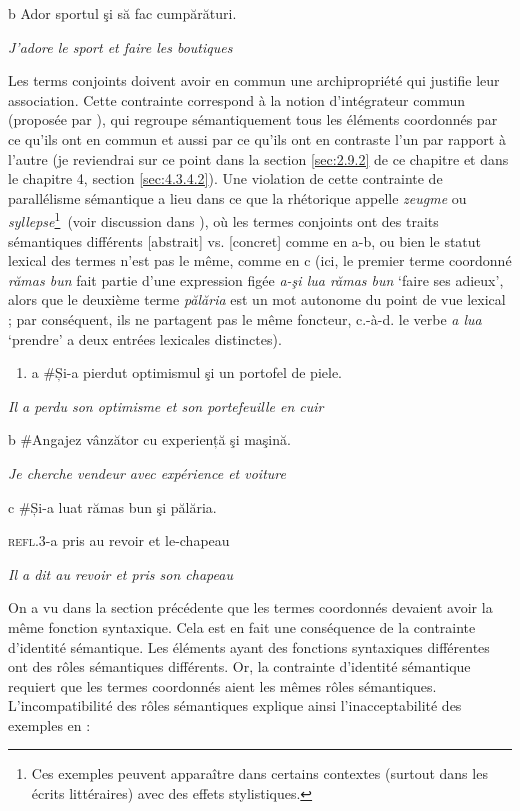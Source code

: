 b  Ador sportul şi să fac cumpărături. 

    \textit{J'adore le sport et faire les boutiques}

Les terms conjoints doivent avoir en commun une archipropriété qui justifie leur association. Cette contrainte correspond à la notion d'intégrateur commun (proposée par \citet{Lang1984}), qui regroupe sémantiquement tous les éléments coordonnés par ce qu'ils ont en commun et aussi par ce qu'ils ont en contraste l'un par rapport à l'autre (je reviendrai sur ce point dans la section \ref{sec:2.9.2} de ce chapitre et dans le chapitre 4, section \ref{sec:4.3.4.2}). Une violation de cette contrainte de parallélisme sémantique a lieu dans ce que la rhétorique appelle \textit{zeugme} ou \textit{syllepse}\footnote{Ces exemples peuvent apparaître dans certains contextes (surtout dans les écrits littéraires) avec des effets stylistiques.}~(voir discussion dans \citet{Zafiu2001}), où les termes conjoints ont des traits sémantiques différents [abstrait] vs. [concret] comme en a-b, ou bien le statut lexical des termes n'est pas le même, comme en c (ici, le premier terme coordonné \textit{rămas bun} fait partie d'une expression figée \textit{a-şi lua rămas bun} `faire ses adieux', alors que le deuxième terme \textit{pălăria} est un mot autonome du point de vue lexical ; par conséquent, ils ne partagent pas le même foncteur, c.-à-d. le verbe \textit{a lua} `prendre' a deux entrées lexicales distinctes). 


\begin{enumerate}
\item \label{bkm:Ref272834660}a  \#Și-a pierdut optimismul şi un portofel de piele.


\end{enumerate}
{\itshape
Il a perdu son optimisme et son portefeuille en cuir}

b  \#Angajez vânzător cu experiență şi maşină. 

{\itshape
Je cherche vendeur avec expérience et voiture}

c  \#Și-a  luat  rămas bun  şi  pălăria. 

    \textsc{refl.3}-a  pris  au revoir  et  le-chapeau

{\itshape
    Il a dit au revoir et pris son chapeau}

On a vu dans la section précédente que les termes coordonnés devaient avoir la même fonction syntaxique. Cela est en fait une conséquence de la contrainte d'identité sémantique. Les éléments ayant des fonctions syntaxiques différentes ont des rôles sémantiques différents. Or, la contrainte d'identité sémantique requiert que les termes coordonnés aient les mêmes rôles sémantiques. L'incompatibilité des rôles sémantiques explique ainsi l'inacceptabilité des exemples en  : 


